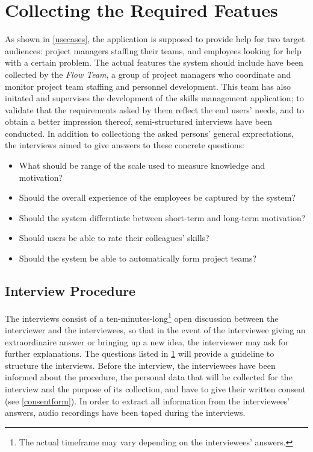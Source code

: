 \section{Collecting the Required Featues}
\label{interviewquestions}
As shown in \ref{usecases}, the application is supposed to provide help for two target audiences: project managers staffing their teams, and employees looking for help with a certain problem.
The actual features the system should include have been collected by the \textit{Flow Team}, a group of project managers who coordinate and monitor project team staffing and personnel development. This team has also initated and supervises the development of the skills management application; to validate that the requirements asked by them reflect the end users' needs, and to obtain a better impression thereof, semi-structured interviews have been conducted. In addition to collectiong the asked persons' general exprectations, the interviews aimed to give answers to these concrete questions:
\begin{itemize}
	\item What should be range of the scale used to measure knowledge and motivation?
	\item Should the overall experience of the employees be captured by the system?
	\item Should the system differntiate between short-term and long-term motivation?
	\item Should users be able to rate their colleagues' skills?
	\item Should the system be able to automatically form project teams?
\end{itemize}

\subsection{Interview Procedure}
The interviews consist of a ten-minutes-long\footnote{The actual timeframe may vary depending on the interviewees' answers.} open discussion between the interviewer and the interviewees, so that in the event of the interviewee giving an extraordinaire answer or bringing up a new idea, the interviewer may ask for further explanations. The questions listed in \ref{interviewquestions} will provide a guideline to structure the interviews. Before the interview, the interviewees have been informed about the procedure, the personal data that will be collected for the interview and the purpose of its collection, and have to give their written consent (see \ref{consentform}).
In order to extract all information from the interviewees' answers, audio recordings have been taped during the interviews.

